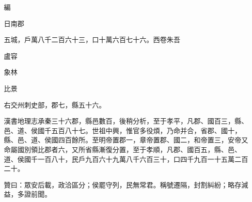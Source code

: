 \begin{pinyinscope}
編

日南郡

五城，戶萬八千二百六十三，口十萬六百七十六。西卷朱吾

盧容

象林

比景

右交州刺史部，郡七，縣五十六。

漢書地理志承秦三十六郡，縣邑數百，後稍分析，至于孝平，凡郡、國百三，縣、邑、道、侯國千五百八十七。世祖中興，惟官多役煩，乃命并合，省郡、國十，縣、邑、道、侯國四百餘所。至明帝置郡一，章帝置郡、國二，和帝置三，安帝又命屬國別領比郡者六，又所省縣漸復分置，至于孝順，凡郡、國百五，縣、邑、道、侯國千一百八十，民戶九百六十九萬八千六百三十，口四千九百一十五萬二百二十。

贊曰：眾安后載，政洽區分；侯罷守列，民無常君。稱號遷隔，封割糾紛；略存減益，多證前聞。


\end{pinyinscope}